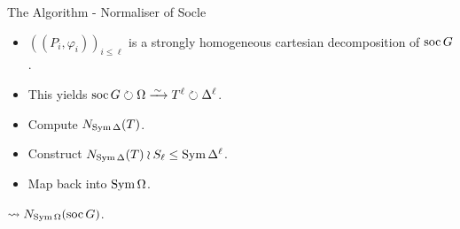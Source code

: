 \begin{frame}{The Algorithm - Normaliser of Socle}
    \begin{itemize}
        \setlength\itemsep{\fill}
        \item
        $((P_i, \varphi_i))_{i \leq \ell}$
        is a strongly homogeneous cartesian decomposition of $\operatorname{soc} G$.
        \pause
        \item
        This yields
        $\soc G \circlearrowright \Omega
        \iso
        T ^ \ell \circlearrowright \Delta ^ \ell$.
        \pause
        \item
        Compute $N_{\operatorname{Sym} \Delta}(T)$.
        \pause
        \item
        Construct $N_{\operatorname{Sym} \Delta}(T) \wr S_\ell \leq \operatorname{Sym} \Delta ^ \ell$.
        \pause
        \item
        Map back into $\operatorname{Sym} \Omega$.
    \end{itemize}
    \pause
    $\leadsto N_{\operatorname{Sym} \Omega}(\operatorname{soc} G)$.
\end{frame}

